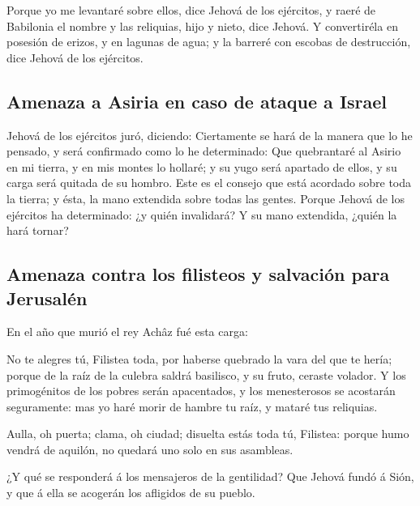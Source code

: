  Porque yo me levantaré sobre ellos, dice Jehová de los
ejércitos, y raeré de Babilonia el nombre y las reliquias, hijo y nieto,
dice Jehová.  Y convertiréla en posesión de erizos, y en
lagunas de agua; y la barreré con escobas de destrucción, dice Jehová de
los ejércitos.

\hypertarget{amenaza-a-asiria-en-caso-de-ataque-a-israel}{%
\subsection{Amenaza a Asiria en caso de ataque a
Israel}\label{amenaza-a-asiria-en-caso-de-ataque-a-israel}}

 Jehová de los ejércitos juró, diciendo: Ciertamente se
hará de la manera que lo he pensado, y será confirmado como lo he
determinado:  Que quebrantaré al Asirio en mi tierra, y
en mis montes lo hollaré; y su yugo será apartado de ellos, y su carga
será quitada de su hombro.  Este es el consejo que está
acordado sobre toda la tierra; y ésta, la mano extendida sobre todas las
gentes.  Porque Jehová de los ejércitos ha determinado:
¿y quién invalidará? Y su mano extendida, ¿quién la hará tornar?

\hypertarget{amenaza-contra-los-filisteos-y-salvaciuxf3n-para-jerusaluxe9n}{%
\subsection{Amenaza contra los filisteos y salvación para
Jerusalén}\label{amenaza-contra-los-filisteos-y-salvaciuxf3n-para-jerusaluxe9n}}

 En el año que murió el rey Achâz fué esta carga:

 No te alegres tú, Filistea toda, por haberse quebrado la
vara del que te hería; porque de la raíz de la culebra saldrá basilisco,
y su fruto, ceraste volador.  Y los primogénitos de los
pobres serán apacentados, y los menesterosos se acostarán seguramente:
mas yo haré morir de hambre tu raíz, y mataré tus reliquias.

 Aulla, oh puerta; clama, oh ciudad; disuelta estás toda
tú, Filistea: porque humo vendrá de aquilón, no quedará uno solo en sus
asambleas.

 ¿Y qué se responderá á los mensajeros de la gentilidad?
Que Jehová fundó á Sión, y que á ella se acogerán los afligidos de su
pueblo.

